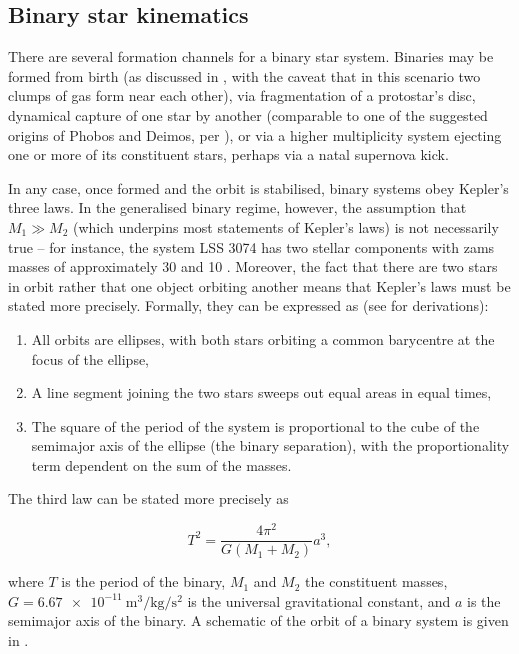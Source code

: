 \subsection{Binary star kinematics}\label{sec:binary_kinematics}

There are several formation channels for a binary star system. Binaries may be formed from birth (as discussed in , with the caveat that in this scenario two clumps of gas form near each other), via fragmentation of a protostar's disc, dynamical capture of one star by another (comparable to one of the suggested origins of Phobos and Deimos, per \citet{Burns:1978}), or via a higher multiplicity system ejecting one or more of its constituent stars, perhaps via a natal supernova kick.

In any case, once formed and the orbit is stabilised, binary systems obey Kepler's three laws. In the generalised binary regime, however, the assumption that $M_1\gg M_2$ (which underpins most statements of Kepler's laws) is not necessarily true -- for instance, the system LSS 3074 has two stellar components with \gls{zams} masses of approximately \SI{30}{\msun} and \SI{10}{\msun} \citep{Raucq:2017}. Moreover, the fact that there are two stars in orbit rather that one object orbiting another means that Kepler's laws must be stated more precisely. Formally, they can be expressed as (see  for derivations):

\begin{enumerate}
    \item All orbits are ellipses, with both stars orbiting a common barycentre at the focus of the ellipse,
    \item A line segment joining the two stars sweeps out equal areas in equal times,
    \item The square of the period of the system is proportional to the cube of the semimajor axis of the ellipse (the binary separation), with the proportionality term dependent on the sum of the masses.
\end{enumerate}

The third law can be stated more precisely as

\begin{equation}
    T^2 = \frac{4\pi^2}{G(M_1+M_2)}a^3,
\end{equation}

where $T$ is the period of the binary, $M_1$ and $M_2$ the constituent masses, $G=\SI{6.67e-11}{\meter\cubed\per\kilogram\per\second\squared}$ is the universal gravitational constant, and $a$ is the semimajor axis of the binary. A schematic of the orbit of a binary system is given in .

